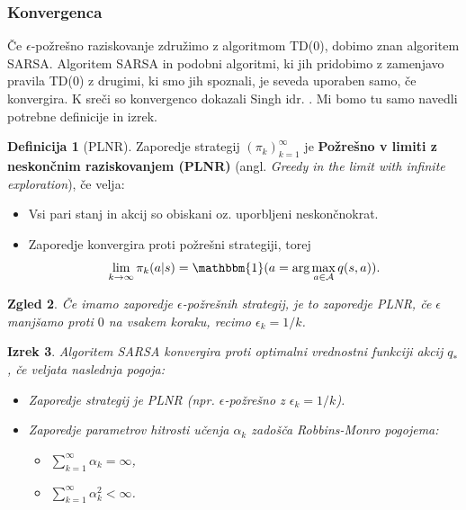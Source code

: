 \documentclass[12pt,a4paper]{amsart}
\theoremstyle{definition} %
\newtheorem{definicija}{Definicija}[section]
\theoremstyle{plain} %
\newtheorem{izrek}[definicija]{Izrek}
\newtheorem{zgled}[definicija]{Zgled}
\begin{document}
\subsubsection{Konvergenca}
Če $\epsilon$-požrešno raziskovanje združimo z algoritmom TD($0$), dobimo znan algoritem SARSA. 
Algoritem SARSA in podobni algoritmi, ki jih pridobimo z zamenjavo pravila TD($0$) z drugimi, ki smo 
jih spoznali, je seveda uporaben samo, če konvergira. K sreči so konvergenco dokazali Singh idr. 
\cite{dokaz}. Mi bomo tu samo navedli potrebne definicije in izrek.

\begin{definicija}[PLNR]
    Zaporedje strategij $(\pi_k)_{k=1}^\infty$ je \textbf{Požrešno v limiti z neskončnim raziskovanjem 
    (PLNR)} (angl. \textit{Greedy in the limit with infinite exploration}), če velja:
    \begin{itemize}
        \item Vsi pari stanj in akcij so obiskani oz. uporbljeni neskončnokrat.
        \item Zaporedje konvergira proti požrešni strategiji, torej 
            $$
            \lim_{k \rightarrow \infty} \pi_k(a|s) = \mathbbm{1} (a = \text{arg}\max_{a \in \mathcal{A}} 
                q(s, a)).
            $$
    \end{itemize}
\end{definicija}

\begin{zgled}
    Če imamo zaporedje $\epsilon$-požrešnih strategij, je to zaporedje PLNR, če $\epsilon$ manjšamo 
    proti $0$ na vsakem koraku, recimo $\epsilon_k = 1 / k$.
\end{zgled}

\begin{izrek}
    Algoritem SARSA konvergira proti optimalni vrednostni funkciji akcij $q_*$, če veljata naslednja 
    pogoja:
    \begin{itemize}
        \item Zaporedje strategij je PLNR (npr. $\epsilon$-požrešno z $\epsilon_k = 1 / k$).
        \item Zaporedje parametrov hitrosti učenja $\alpha_k$ zadošča \textit{Robbins-Monro} pogojema:
            \begin{itemize}
                \item $\sum_{k=1}^\infty \alpha_k = \infty$,
                \item $\sum_{k=1}^\infty \alpha_k^2 < \infty$.
            \end{itemize}
    \end{itemize}
\end{izrek}
\end{document}
